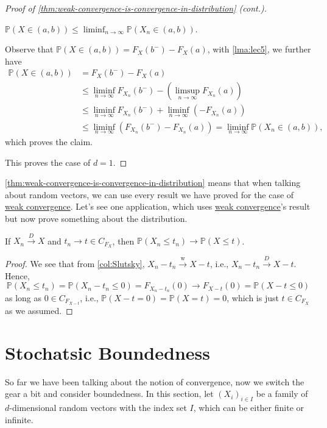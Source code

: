 \begin{proof}[Proof of \autoref{thm:weak-convergence-is-convergence-in-distribution} (cont.)]
	\begin{claim}
		\(\mathbb{P} (X \in (a, b)) \leq \liminf_{n \to \infty} \mathbb{P} (X_n \in (a, b))\).
	\end{claim}
	\begin{explanation}
		Observe that \(\mathbb{P} (X \in (a, b)) = F_X(b^-) - F_X(a)\), with \autoref{lma:lec5}, we further have
		\[
			\begin{split}
				\mathbb{P} (X \in (a, b))
				 & = F_X(b^-) - F_X(a)                                                                         \\
				 & \leq \liminf_{n \to \infty} F_{X_n}(b^-) - \left( \limsup_{n \to \infty} F_{X_n}(a) \right) \\
				 & \leq \liminf_{n \to \infty} F_{X_n}(b^-) + \liminf_{n \to \infty} (-F_{X_n}(a))             \\
				 & \leq \liminf_{n \to \infty} \left( F_{X_n}(b^-) - F_{X_n}(a) \right)
				= \liminf_{n \to \infty} \mathbb{P} (X_n \in (a, b)),
			\end{split}
		\]
		which proves the claim.
	\end{explanation}
	This proves the case of \(d = 1\).
\end{proof}

\autoref{thm:weak-convergence-is-convergence-in-distribution} means that when talking about random vectors, we can use every result we have proved for the case of \hyperref[def:weak-convergence]{weak convergence}. Let's see one application, which uses \hyperref[def:weak-convergence]{weak convergence}'s result but now prove something about the distribution.

\begin{proposition}
	If \(X_n \overset{D}{\to } X\) and \(t_n \to t \in C_{F_X}\), then \(\mathbb{P} (X_n \leq t_n) \to \mathbb{P} (X \leq t)\).
\end{proposition}
\begin{proof}
	We see that from \autoref{col:Slutsky}, \(X_n - t_n \overset{\text{w} }{\to } X - t\), i.e., \(X_n - t_n \overset{D}{\to } X - t\). Hence,
	\[
		\mathbb{P} (X_n \leq t_n)
		= \mathbb{P} (X_n - t_n \leq 0)
		= F_{X_n - t_n} (0)
		\to F_{X - t} (0)
		= \mathbb{P} (X - t \leq 0)
	\]
	as long as \(0 \in C_{F_{X - t}}\), i.e., \(\mathbb{P} (X - t = 0) = \mathbb{P} (X = t) = 0\), which is just \(t \in C_{F_X}\) as we assumed.
\end{proof}

\section{Stochatsic Boundedness}
So far we have been talking about the notion of convergence, now we switch the gear a bit and consider boundedness. In this section, let \((X_i)_{i \in I}\) be a family of \(d\)-dimensional random vectors with the index set \(I\), which can be either finite or infinite.

